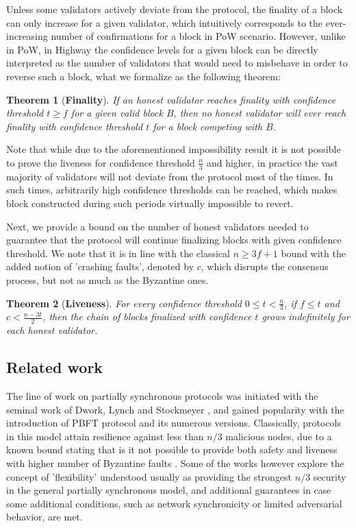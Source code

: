 \documentclass[12pt, fleqn]{article}
\newtheorem{theorem}{Theorem}
\begin{document}
Unless some validators actively deviate from the protocol, the finality of a block can only increase for a given validator, which intuitively corresponds to the ever-increasing number of confirmations for a block in PoW scenario.
However, unlike in PoW, in Highway the confidence levels for a given block can be directly interpreted as the number of validators that would need to misbehave in order to reverse such a block, what we formalize as the following theorem:

\begin{theorem}[\bf Finality]\label{thm:finality}
If an honest validator reaches finality with confidence threshold $t\geq f$ for a given valid block $B$, then no honest validator will ever reach finality with confidence threshold $t$ for a block competing with $B$.
\end{theorem}

Note that while due to the aforementioned impossibility result \cite{DLS88} it is not possible to prove the liveness for confidence threshold $\frac{n}{3}$ and higher, in practice the vast majority of validators will not deviate from the protocol most of the times.
In such times, arbitrarily high confidence thresholds can be reached, which makes block constructed during such periods virtually impossible to revert.

Next, we provide a bound on the number of honest validators needed to guarantee that the protocol will continue finalizing blocks with given confidence threshold.
We note that it is in line with the classical $n\geq 3f+1$ bound with the added notion of 'crashing faults', denoted by $c$, which disrupts the consensus process, but not as much as the Byzantine ones. 

\begin{theorem}[\bf Liveness]\label{thm:liveness}
For every confidence threshold $0 \leq t < \frac{n}{3}$, if $f\leq t$ and $c< \frac{n-3t}{2}$, then the chain of blocks finalized with confidence $t$ grows indefinitely for each honest validator.
\end{theorem}


\subsection{Related work}

The line of work on partially synchronous protocols was initiated with the seminal work of Dwork, Lynch and Stockmeyer \cite{DLS88}, and gained popularity with the introduction of PBFT\cite{CL99} protocol and its numerous versions\cite{BKM18, KADCW09, MNR19}. 
Classically, protocols in this model attain resilience against less than $n/3$ malicious nodes, due to a known bound stating that is it not possible to provide both safety and liveness with higher number of Byzantine faults \cite{DLS88}.
Some of the works however explore the concept of 'flexibility' understood usually as providing the strongest $n/3$ security in the general partially synchronous model, and additional guarantees in case some additional conditions, such as network synchronicity or limited adversarial behavior, are met.
\end{document}
